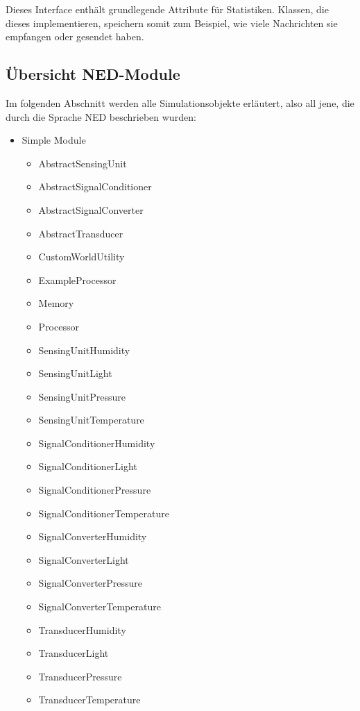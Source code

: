 Dieses Interface enthält grundlegende Attribute für Statistiken. Klassen, die dieses implementieren, speichern somit zum Beispiel, wie viele Nachrichten sie empfangen oder gesendet haben. 

\subsection{Übersicht NED-Module}

Im folgenden Abschnitt werden alle Simulationsobjekte erläutert, also all jene, die durch die Sprache NED beschrieben wurden:

\begin{minipage}{\textwidth}
\begin{itemize}{\label{enum:NedModules}}
\item Simple Module
\begin{multicols}{2}
\begin{itemize}
\item AbstractSensingUnit
\item AbstractSignalConditioner
\item AbstractSignalConverter
\item AbstractTransducer
\item CustomWorldUtility
\item ExampleProcessor
\item Memory
\item Processor
\item SensingUnitHumidity
\item SensingUnitLight
\item SensingUnitPressure
\item SensingUnitTemperature
\item SignalConditionerHumidity
\item SignalConditionerLight
\item SignalConditionerPressure
\item SignalConditionerTemperature
\item SignalConverterHumidity
\item SignalConverterLight
\item SignalConverterPressure
\item SignalConverterTemperature
\item TransducerHumidity
\item TransducerLight
\item TransducerPressure
\item TransducerTemperature 
\end{itemize}

\end{multicols}
\end{itemize}
\end{minipage}
